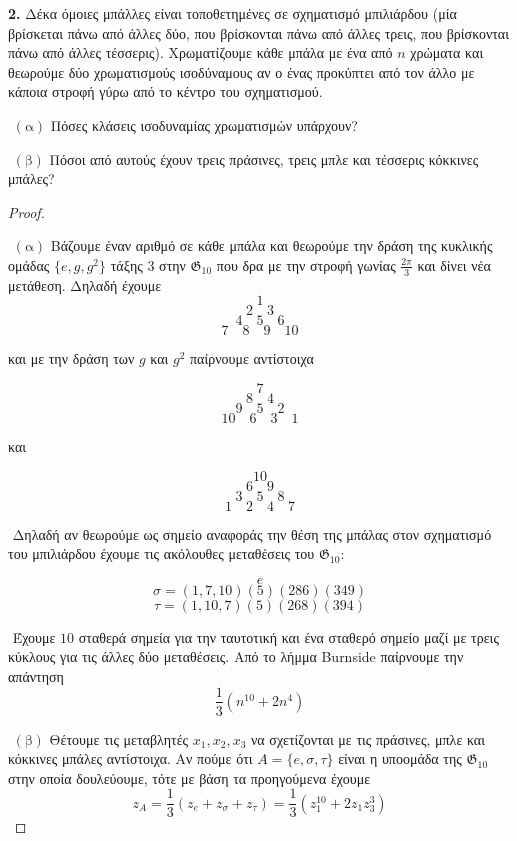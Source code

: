 \documentclass[oneside,a4paper]{article}
\newcommand {\tl}{\textlatin}
\begin{document}
\noindent \textbf{2. } Δέκα όμοιες μπάλλες είναι τοποθετημένες σε σχηματισμό μπιλιάρδου (μία βρίσκεται πάνω από άλλες δύο, που βρίσκονται πάνω από άλλες τρεις, που βρίσκονται πάνω από άλλες τέσσερις). Χρωματίζουμε κάθε μπάλα με ένα από $n$ χρώματα και θεωρούμε δύο χρωματισμούς ισοδύναμους αν ο ένας προκύπτει από τον άλλο με κάποια στροφή γύρω από το κέντρο του σχηματισμού.

$ $\newline
$(\text{α})$ Πόσες κλάσεις ισοδυναμίας χρωματισμών υπάρχουν?

$ $\newline
$(\text{β})$ Πόσοι από αυτούς έχουν τρεις πράσινες, τρεις μπλε και τέσσερις κόκκινες μπάλες?

\vspace*{1cm}
\begin{proof} $ $

	$ $\newline
	$(\text{α})$ Βάζουμε έναν αριθμό σε κάθε μπάλα και θεωρούμε την δράση της κυκλικής ομάδας $\{e,g,g^2\}$ τάξης $3$ στην $\mathfrak{G}_{10}$ που δρα με την στροφή γωνίας $\frac{2\pi}{3}$ και δίνει νέα μετάθεση. Δηλαδή έχουμε
	$$1$$
	$$2 \quad 3$$
	$$4 \quad 5 \quad 6$$
	$$7 \quad 8 \quad 9 \quad 10$$

	και με την δράση των $g$ και $g^2$ παίρνουμε αντίστοιχα
	
	$$7$$
	$$8 \quad 4$$
	$$9 \quad 5 \quad 2$$
	$$10 \quad 6 \quad 3 \quad 1$$
	
	και
	
	$$10$$
	$$6 \quad 9$$
	$$3 \quad 5 \quad 8$$
	$$1 \quad 2 \quad 4 \quad 7$$

	$ $\newline
	Δηλαδή αν θεωρούμε ως σημείο αναφοράς την θέση της μπάλας στον σχηματισμό του μπιλιάρδου έχουμε τις ακόλουθες μεταθέσεις του $\mathfrak{G}_{10}$:

	$$e$$
	$$\sigma = (1,7,10)(5)(286)(349)$$
	$$\tau = (1,10,7)(5)(268)(394)$$

	$ $\newline
	Έχουμε $10$ σταθερά σημεία για την ταυτοτική και ένα σταθερό σημείο μαζί με τρεις κύκλους για τις άλλες δύο μεταθέσεις. Από το λήμμα \tl{Burnside} παίρνουμε την απάντηση
	$$\frac{1}{3}\left(n^{10} + 2n^4\right)$$


	$ $\newline
	$(\text{β})$ Θέτουμε τις μεταβλητές $x_1, x_2 ,x_3$ να σχετίζονται με τις πράσινες, μπλε και κόκκινες μπάλες αντίστοιχα. Αν πούμε ότι $A = \{e,\sigma,\tau\}$ είναι η υποομάδα της $\mathfrak{G}_{10}$ στην οποία δουλεύουμε, τότε με βάση τα προηγούμενα έχουμε 
	$$z_A = \frac{1}{3}\left(z_e + z_{\sigma} + z_{\tau}\right) = \frac13 \left(z^{10}_1 + 2 z_1 z^3_3\right)$$


\end{proof}
\end{document}
